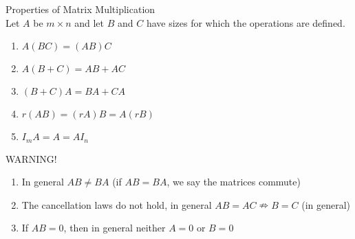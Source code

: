 \documentclass[a4paper,12pt,openany]{book}
\theoremstyle{defn}
\theoremstyle{expl}
\begin{document}
\noindent Properties of Matrix Multiplication\\
Let $A$ be $m\times n$ and let $B$ and $C$ have sizes for which the operations are defined.
\begin{multicols}{2}
\begin{enumerate}
\item $A(BC)=(AB)C$
\item $A(B+C)=AB+AC$
\item $(B+C)A=BA+CA$
\item $r(AB)=(rA)B=A(rB)$
\item $I_mA=A=AI_n$
\end{enumerate}
\end{multicols}
\noindent WARNING!
\begin{enumerate}
\item In general $AB\neq BA$ (if $AB=BA$, we say the matrices commute)
\item The cancellation laws do not hold, in general $AB=AC \nRightarrow B=C$ (in general)
\item If $AB=0$, then in general neither $A=0$ or $B=0$
\end{enumerate}
\end{document}
